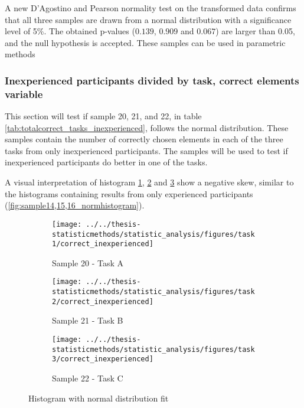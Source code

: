 A new D'Agostino and Pearson normality test on the transformed data confirms that all three samples are drawn from a normal distribution with a significance level of 5\%. The obtained p-values ($0.139$, $0.909$ and $0.067$) are larger than 0.05, and the null hypothesis is accepted. These samples can be used in parametric methods \\[0.2cm]

\subsubsection[Sample 20, 21 and 22]{Inexperienced participants  divided by task, correct elements variable}\label{sec:sample_20,21,22_normalitytest}
This section will test if sample 20, 21, and 22, in table \ref{tab:totalcorrect_tasks_inexperienced}, follows the normal distribution. These samples contain the number of correctly chosen elements in each of the three tasks from only inexperienced participants. The samples will be used to test if inexperienced participants do better in one of the tasks. 

A visual interpretation of histogram \ref{fig:correctinexperienced_task1}, \ref{fig:correctinexperienced_task2} and \ref{fig:correctinexperienced_task3} show a negative skew, similar to the histograms containing results from only experienced participants (\ref{fig:sample14,15,16_normhistogram}).

\begin{figure}[H]
	\centering
	\begin{subfigure}[b]{0.32\textwidth}
		\centering
		\texttt{[image: ../../thesis-statisticmethods/statistic\_analysis/figures/task1/correct\_inexperienced]}
		\caption{Sample 20 - Task A}
		\label{fig:correctinexperienced_task1}
	\end{subfigure}
	\begin{subfigure}[b]{0.32\textwidth}
		\centering
		\texttt{[image: ../../thesis-statisticmethods/statistic\_analysis/figures/task2/correct\_inexperienced]}
		\caption{Sample 21 - Task B}
		\label{fig:correctinexperienced_task2}
	\end{subfigure}
	\begin{subfigure}[b]{0.32\textwidth}
		\centering
		\texttt{[image: ../../thesis-statisticmethods/statistic\_analysis/figures/task3/correct\_inexperienced]}
		\caption{Sample 22 - Task C}
		\label{fig:correctinexperienced_task3}
	\end{subfigure}
	\caption{Histogram with normal distribution fit}
	\label{fig:sample20,21,22_normtest_original}
\end{figure}

